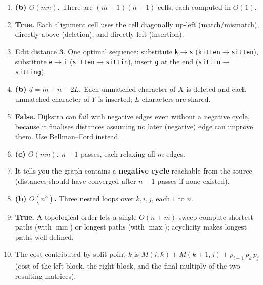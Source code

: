 \documentclass[11pt]{article}
\begin{document}
\begin{enumerate}[label=\textbf{B\arabic*.}, leftmargin=2.2em]

\item \textbf{(b) $O(mn)$.} There are $(m+1)(n+1)$ cells, each computed in $O(1)$.

\item \textbf{True.} Each alignment cell uses the cell diagonally up-left (match/mismatch),
directly above (deletion), and directly left (insertion).

\item Edit distance $\mathbf{3}$. One optimal sequence: substitute \texttt{k}$\to$\texttt{s}
(\texttt{kitten}$\to$\texttt{sitten}), substitute \texttt{e}$\to$\texttt{i}
(\texttt{sitten}$\to$\texttt{sittin}), insert \texttt{g} at the end
(\texttt{sittin}$\to$\texttt{sitting}).

\item \textbf{(b) $d = m + n - 2L$.} Each unmatched character of $X$ is deleted and each
unmatched character of $Y$ is inserted; $L$ characters are shared.

\item \textbf{False.} Dijkstra can fail with negative edges even without a negative cycle,
because it finalises distances assuming no later (negative) edge can improve them. Use
Bellman--Ford instead.

\item \textbf{(c) $O(mn)$.} $n-1$ passes, each relaxing all $m$ edges.

\item It tells you the graph contains a \textbf{negative cycle} reachable from the source
(distances should have converged after $n-1$ passes if none existed).

\item \textbf{(b) $O(n^3)$.} Three nested loops over $k, i, j$, each $1$ to $n$.

\item \textbf{True.} A topological order lets a single $O(n+m)$ sweep compute shortest paths
(with $\min$) or longest paths (with $\max$); acyclicity makes longest paths well-defined.

\item The cost contributed by split point $k$ is
$M(i,k) + M(k+1,j) + p_{i-1}\,p_k\,p_j$ (cost of the left block, the right block, and the
final multiply of the two resulting matrices).

\end{enumerate}
\end{document}
